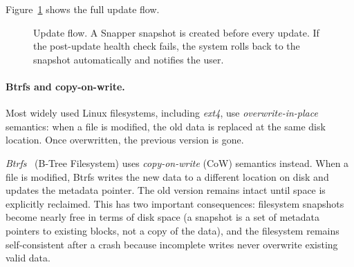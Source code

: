 Figure~\ref{fig:update-flow} shows the full update flow.

\begin{figure}[htbp]
\centering
{}
\caption{Update flow. A Snapper snapshot is created before every update.
If the post-update health check fails, the system rolls back to the snapshot
automatically and notifies the user.}
\label{fig:update-flow}
\end{figure}

\paragraph{Btrfs and copy-on-write.}
Most widely used Linux filesystems, including \emph{ext4}, use
\emph{overwrite-in-place} semantics: when a file is modified, the old data is
replaced at the same disk location. Once overwritten, the previous version is
gone.

\emph{Btrfs}~\cite{archwiki:btrfs}
(B-Tree Filesystem) uses \emph{copy-on-write} (CoW) semantics instead. When a
file is modified, Btrfs writes the new data to a different location on disk and
updates the metadata pointer. The old version remains intact until space is
explicitly reclaimed. This has two important consequences: filesystem snapshots
become nearly free in terms of disk space (a snapshot is a set of metadata
pointers to existing blocks, not a copy of the data), and the filesystem remains
self-consistent after a crash because incomplete writes never overwrite existing
valid data.

